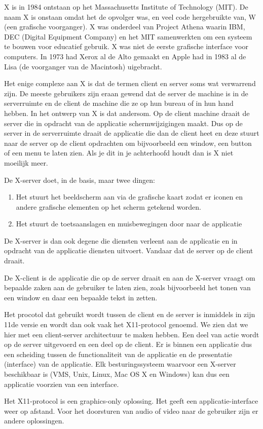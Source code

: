 X is in 1984 ontstaan op het Massachusetts Institute of Technology (MIT). De naam X is onstaan omdat het de opvolger was, en veel code hergebruikte van, W (een grafische voorganger). X was onderdeel van Project Athena waarin IBM, DEC (Digital Equipment Company) en het MIT samenwerkten om een systeem te bouwen voor educatief gebruik. X was niet de eerste grafische interface voor computers. In 1973 had Xerox al de Alto gemaakt en Apple had in 1983 al de Lisa (de voorganger van de Macintosh) uigebracht.

Het enige complexe aan X is dat de termen client en server soms wat verwarrend zijn. De meeste gebruikers zijn eraan gewend dat de server de machine is in de serverruimte en de client de machine die ze op hun bureau of in hun hand hebben. In het ontwerp van X is dat andersom. Op de client machine draait de server die in opdracht van de applicatie schermwijzigingen maakt. Dus op de server in de serverruimte draait de applicatie die dan de client heet en deze stuurt naar de server op de client opdrachten om bijvoorbeeld een window, een button of een menu te laten zien. Als je dit in je achterhoofd houdt dan is X niet moeilijk meer.

De X-server doet, in de basis, maar twee dingen:
\begin{enumerate}
\item Het stuurt het beeldscherm aan via de grafische kaart zodat er iconen en andere grafische elementen op het scherm getekend worden.
\item Het stuurt de toetsaanslagen en muisbewegingen door naar de applicatie
\end{enumerate}
De X-server is dan ook degene die diensten verleent aan de applicatie en in opdracht van de applicatie diensten uitvoert. Vandaar dat de server op de client draait.

De X-client is de applicatie die op de server draait en aan de X-server vraagt om bepaalde zaken aan de gebruiker te laten zien, zoals bijvoorbeeld het tonen van een window en daar een bepaalde tekst in zetten.

Het procotol dat gebruikt wordt tussen de client en de server is inmiddels in zijn 11de versie en wordt dan ook vaak het X11-protocol genoemd. We zien dat we hier met een client-server architectuur te maken hebben. Een deel van actie wordt op de server uitgevoerd en een deel op de client. Er is binnen een applicatie dus een scheiding tussen de functionaliteit van de applicatie en de presentatie (interface) van de applicatie. Elk besturingssysteem waarvoor een X-server beschikbaar is (VMS, Unix, Linux, Mac OS X en Windows) kan dus een applicatie voorzien van een interface.

Het X11-protocol is een graphics-only oplossing. Het geeft een applicatie-interface weer op afstand. Voor het doorsturen van audio of video naar de gebruiker zijn er andere oplossingen.
